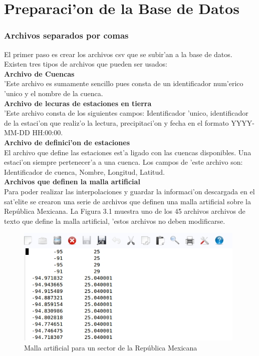 \section{Preparaci'on de la Base de Datos}
\subsubsection*{Archivos separados por comas}
El primer paso es crear los archivos csv que se subir'an a la base de datos. Existen tres tipos de archivos que pueden ser usados: \\

\textbf{Archivo de Cuencas} \\
'Este archivo es sumamente sencillo pues consta de un identificador num'erico 'unico y el nombre de la cuenca. \\

\textbf{Archivo de lecuras de estaciones en tierra}  \\
'Este archivo consta de los siguientes campos: Identificador 'unico, identificador de la estaci'on que realiz'o la lectura, precipitaci'on
y fecha en el formato YYYY-MM-DD HH:00:00. \\

\textbf{Archivo de definici'on de estaciones} \\
El archivo que define las estaciones est'a ligado con las cuencas disponibles. Una estaci'on siempre pertenecer'a a una cuenca.
Los campos de 'este archivo son: Identificador de cuenca, Nombre, Longitud, Latitud.\\

\textbf{Archivos que definen la malla artificial}\\
Para poder realizar las interpolaciones y guardar la informaci'on descargada en el sat'elite
se crearon una serie de archivos que definen una malla artificial sobre la República Mexicana.
La Figura 3.1 muestra uno de los 45 archivos archivos de texto que define la malla artificial, 'estos archivos
no deben modificarse. 

\begin{figure}[h!]
 \centering
 \includegraphics[width=110mm, bb=0 0 538 278]{./imagenes/mallaArificial.jpg}
 \caption{Malla artificial para un sector de la República Mexicana}
\end{figure}

